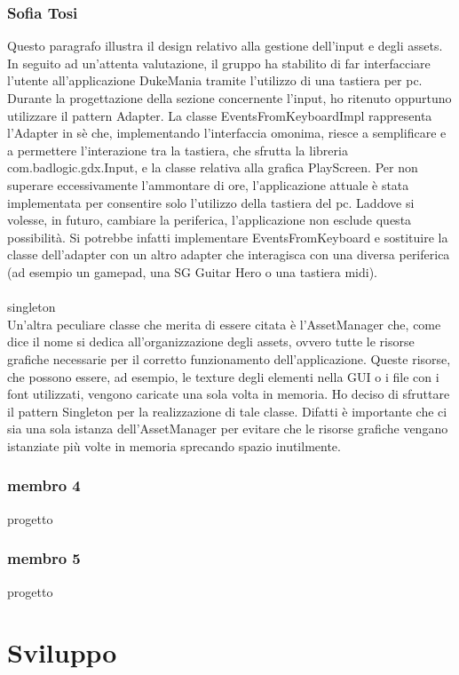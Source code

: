\documentclass[a4paper,12pt]{report}
\begin{document}
\subsection{Sofia Tosi}
Questo paragrafo illustra il design relativo alla gestione dell'input e degli assets.
In seguito ad un'attenta valutazione, il gruppo ha stabilito di far interfacciare l'utente all'applicazione DukeMania tramite l'utilizzo di
una tastiera per pc. 
Durante la progettazione della sezione concernente l'input, ho ritenuto oppurtuno utilizzare il pattern Adapter.
La classe EventsFromKeyboardImpl rappresenta l'Adapter in sè che, implementando l'interfaccia omonima, riesce a semplificare e a permettere l'interazione
tra la tastiera, che sfrutta la libreria com.badlogic.gdx.Input, e la classe relativa alla grafica PlayScreen.
Per non superare eccessivamente l'ammontare di ore, l'applicazione attuale è stata implementata per consentire solo l'utilizzo della tastiera del pc. 
Laddove si volesse, in futuro, cambiare la periferica, l'applicazione non esclude questa possibilità. Si potrebbe infatti implementare EventsFromKeyboard 
e sostituire la classe dell'adapter con un altro adapter che interagisca con una diversa periferica (ad esempio un gamepad, una SG Guitar Hero o una tastiera midi).
\\ \\
singleton \\
Un'altra peculiare classe che merita di essere citata è l'AssetManager che, come dice il nome si dedica all'organizzazione degli assets, ovvero tutte le risorse grafiche
necessarie per il corretto funzionamento dell'applicazione. Queste risorse, che possono essere, ad esempio, le texture degli elementi nella GUI o i file con i font utilizzati,
vengono caricate una sola volta in memoria.
Ho deciso di sfruttare il pattern Singleton per la realizzazione di tale classe. Difatti è importante che ci sia una sola istanza dell'AssetManager per evitare che le risorse 
grafiche vengano istanziate più volte in memoria sprecando spazio inutilmente. 
\newpage
\subsection{membro 4}
progetto 
\subsection{membro 5}
progetto 
\newpage



\chapter{Sviluppo}
\end{document}
